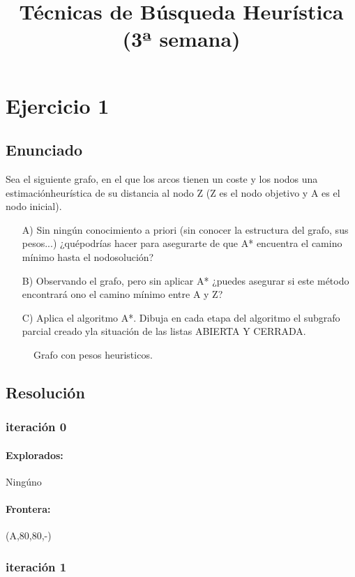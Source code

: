 \documentclass[a4paper,10pt]{article}
\title{Técnicas de Búsqueda Heurística\\(3ª semana)}
\author{}
\begin{document}
\maketitle
\pagebreak
\tableofcontents
\pagebreak

\section{Ejercicio 1}
\subsection{Enunciado}
Sea el siguiente grafo, en el que los arcos tienen un coste y los nodos una estimaciónheurística de su distancia al nodo Z (Z es el nodo objetivo y A es el nodo inicial).
\begin{itemize}
    \item [A)] Sin ningún conocimiento a priori (sin conocer la estructura del grafo, sus pesos...) ¿quépodrías hacer para asegurarte de que A* encuentra el camino mínimo hasta el nodosolución?
    \item [B)] Observando el grafo, pero sin aplicar A* ¿puedes asegurar si este método encontrará ono el camino mínimo entre A y Z?
    \item [C)] Aplica el algoritmo A*. Dibuja en cada etapa del algoritmo el subgrafo parcial creado yla situación de las listas ABIERTA Y CERRADA.
\end{itemize}
\begin{figure}[hbt]
  \centering
	\scalebox{0.73}{}
	\caption{Grafo con pesos heuristicos.}
	\label{fig:ej1_start}
\end{figure}
\pagebreak
\subsection{Resolución}
\subsubsection{iteración 0}
\paragraph{Explorados:}Ningúno
\paragraph{Frontera:}(A,80,80,-)

\subsubsection{iteración 1}
\end{document}
